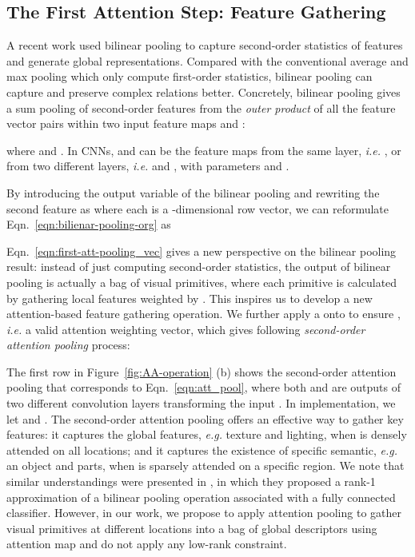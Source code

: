 \documentclass{article}
\begin{document}
\subsection{The First Attention Step: Feature Gathering}
\label{subsec:first_attention}
A recent work \cite{lin2015bilinear} used bilinear pooling to capture second-order statistics of features and generate  global representations. Compared with the conventional average and max pooling which only compute first-order statistics,  bilinear pooling can capture and preserve complex relations better. Concretely, bilinear pooling gives a sum pooling of second-order features from the \emph{outer product} of all the feature vector pairs  within two input feature maps  and :

where  and  . In CNNs,  and  can be the feature maps from the same layer, \emph{i.e.} , or from two different layers, \emph{i.e.}  and , with parameters  and .


By introducing the output variable   of the bilinear pooling and rewriting the second feature   as  where each  is a -dimensional row vector, we can reformulate  Eqn.~\eqref{eqn:bilienar-pooling-org} as

Eqn.~\eqref{eqn:first-att-pooling_vec} gives a new perspective on the bilinear pooling result: instead of just computing second-order statistics, the output of bilinear pooling  is actually a bag of visual primitives, where each primitive  is calculated by gathering local features weighted by  . 
This inspires us to develop a new attention-based feature gathering operation. We further apply a  onto  to ensure , \emph{i.e.} a valid attention weighting vector, which gives following \emph{second-order attention pooling} process: 

The first row in Figure~\ref{fig:AA-operation} (b) shows the second-order attention pooling that corresponds to Eqn.~\eqref{eqn:att_pool}, where both  and  are outputs of two different convolution layers transforming the input . In implementation, we let  and . The second-order attention pooling offers an effective way to gather key features: it captures the global features, \emph{e.g.} texture and lighting, when  is densely attended on all locations; and it captures the existence of specific semantic, \emph{e.g.} an object and parts, when  is sparsely attended on a specific region. We note that similar understandings were presented in \cite{girdhar2017attentional}, in which they proposed a rank-1 approximation of a bilinear pooling operation associated with a fully connected classifier. However, in our work, we propose to apply attention pooling to gather visual primitives at different locations into a bag of global descriptors using  attention map and do not apply any low-rank constraint.
\end{document}
